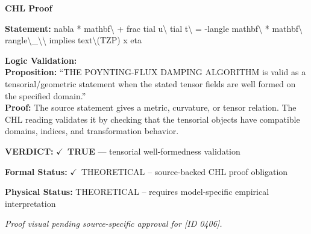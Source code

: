 \vspace{0.45em}
\noindent\textbf{CHL Proof}\par
\textbf{Statement:} nabla * mathbf\textbackslash{} + frac tial u\textbackslash{} tial t\textbackslash{} = -langle mathbf\textbackslash{} * mathbf\textbackslash{} rangle\textbackslash{}\_\textbackslash{}\textbackslash{} implies
text\textbackslash{}(TZP) x eta

\textbf{Logic Validation:}\\
\textbf{Proposition:} ``THE POYNTING-FLUX DAMPING ALGORITHM is valid as a tensorial/geometric statement when the
stated tensor fields are well formed on the specified domain.''\\
\textbf{Proof:} The source statement gives a metric, curvature, or tensor relation. The CHL reading
validates it by checking that the tensorial objects have compatible domains, indices,
and transformation behavior.

\textbf{VERDICT:} \ensuremath{\checkmark}\ \textbf{TRUE} --- tensorial well-formedness validation

\textbf{Formal Status:} \ensuremath{\checkmark}\ THEORETICAL -- source-backed CHL proof obligation

\textbf{Physical Status:} THEORETICAL -- requires model-specific empirical interpretation
\par\vspace{0.45em}
\par
\vfill
\begingroup\footnotesize\itshape
Proof visual pending source-specific approval for [ID 0406].
\par\endgroup
\vfill
\endgroup
\endgroup
